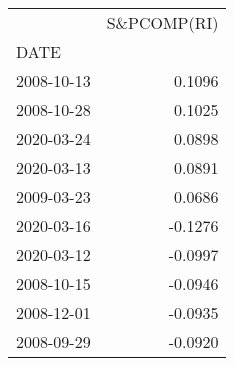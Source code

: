 \begin{tabular}{lr}
\toprule
{} &  S\&PCOMP(RI) \\
DATE       &              \\
\midrule
2008-10-13 &       0.1096 \\
2008-10-28 &       0.1025 \\
2020-03-24 &       0.0898 \\
2020-03-13 &       0.0891 \\
2009-03-23 &       0.0686 \\
2020-03-16 &      -0.1276 \\
2020-03-12 &      -0.0997 \\
2008-10-15 &      -0.0946 \\
2008-12-01 &      -0.0935 \\
2008-09-29 &      -0.0920 \\
\bottomrule
\end{tabular}
